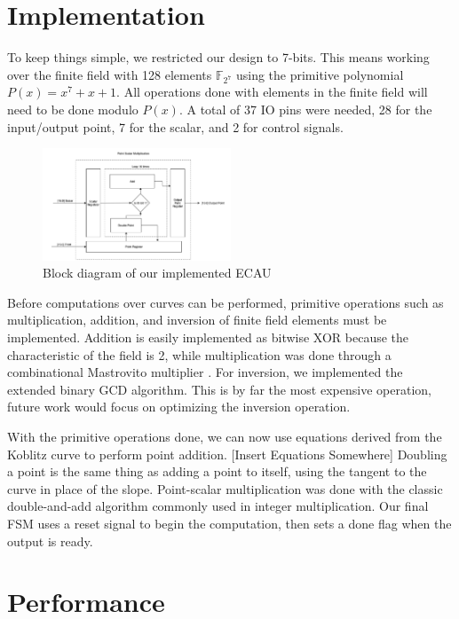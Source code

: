 \documentclass{IEEEtran}
\begin{document}
\section{Implementation}

To keep things simple, we restricted our design to 7-bits. This means working over the finite field with 128 elements $\mathbb{F}_{2^7}$ using the primitive polynomial $P(x) = x^7 + x + 1$. All operations done with elements in the finite field will need to be done modulo $P(x)$. A total of 37 IO pins were needed, 28 for the input/output point, 7 for the scalar, and 2 for control signals. 

\begin{figure}%
\centering
\captionsetup{justification=centering}
\includegraphics[width=0.5\textwidth]{images/blockdiagram.png}
\caption{Block diagram of our implemented ECAU}
\label{shell}
\end{figure}

Before computations over curves can be performed, primitive operations such as multiplication, addition, and inversion of finite field elements must be implemented. Addition is easily implemented as bitwise XOR because the characteristic of the field is 2, while multiplication was done through a combinational Mastrovito multiplier \cite{Kallabook}. For inversion, we implemented the extended binary GCD algorithm. This is by far the most expensive operation, future work would focus on optimizing the inversion operation.

With the primitive operations done, we can now use equations derived from the Koblitz curve to perform point addition. [Insert Equations Somewhere] Doubling a point is the same thing as adding a point to itself, using the tangent to the curve in place of the slope. Point-scalar multiplication was done with the classic double-and-add algorithm commonly used in integer multiplication. Our final FSM uses a reset signal to begin the computation, then sets a done flag when the output is ready. 

\section{Performance}
\end{document}
